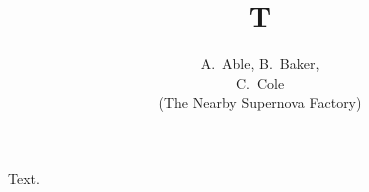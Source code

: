 \documentclass[preprint]{aastex}
\begin{document}
\title{T}
\author
{
    A.~Able,
    B.~Baker, \\
    C.~Cole \\
    (The Nearby Supernova Factory)
}
\maketitle
Text.
\end{document}
